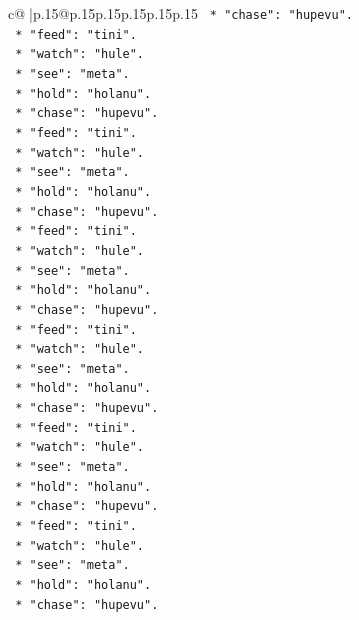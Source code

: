 \documentclass{article}
\begin{document}
{\begin{supertabular}{c@{$\;$}|p{.15\linewidth}@{}p{.15\linewidth}p{.15\linewidth}p{.15\linewidth}p{.15\linewidth}p{.15\linewidth}}
{{{\texttt{            *   "chase": "hupevu".} \\
\texttt{            *   "feed": "tini".} \\
\texttt{            *   "watch": "hule".} \\
\texttt{            *   "see": "meta".} \\
\texttt{            *   "hold": "holanu".} \\
\texttt{            *   "chase": "hupevu".} \\
\texttt{            *   "feed": "tini".} \\
\texttt{            *   "watch": "hule".} \\
\texttt{            *   "see": "meta".} \\
\texttt{            *   "hold": "holanu".} \\
\texttt{            *   "chase": "hupevu".} \\
\texttt{            *   "feed": "tini".} \\
\texttt{            *   "watch": "hule".} \\
\texttt{            *   "see": "meta".} \\
\texttt{            *   "hold": "holanu".} \\
\texttt{            *   "chase": "hupevu".} \\
\texttt{            *   "feed": "tini".} \\
\texttt{            *   "watch": "hule".} \\
\texttt{            *   "see": "meta".} \\
\texttt{            *   "hold": "holanu".} \\
\texttt{            *   "chase": "hupevu".} \\
\texttt{            *   "feed": "tini".} \\
\texttt{            *   "watch": "hule".} \\
\texttt{            *   "see": "meta".} \\
\texttt{            *   "hold": "holanu".} \\
\texttt{            *   "chase": "hupevu".} \\
\texttt{            *   "feed": "tini".} \\
\texttt{            *   "watch": "hule".} \\
\texttt{            *   "see": "meta".} \\
\texttt{            *   "hold": "holanu".} \\
\texttt{            *   "chase": "hupevu".} \\
}}}
\end{supertabular}}
\end{document}
